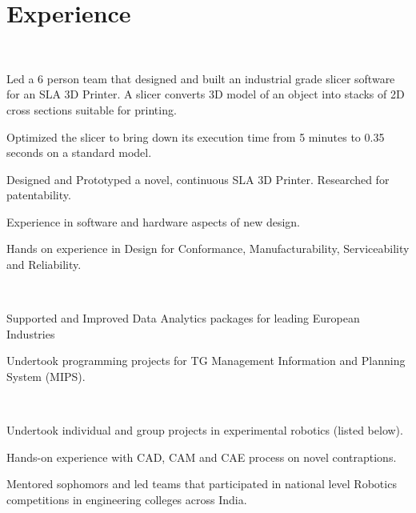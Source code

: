 \documentclass[]{deedy-resume-openfont}
\begin{document}
\begin{minipage}[t]{0.66\textwidth} 



\section{Experience}

\\
\vspace{\topsep}
\begin{tightemize}
\item  Led a 6 person team that designed and built an industrial grade slicer software for an SLA 3D Printer. A slicer converts 3D model of an object into stacks of 2D cross sections suitable for printing.
\item Optimized the slicer to bring down its execution time from 5 minutes to 0.35 seconds on a standard model.
\item Designed and Prototyped a novel, continuous SLA 3D Printer. Researched for patentability.
\item Experience in software and hardware aspects of new design. 
\item Hands on experience in Design for Conformance, Manufacturability, Serviceability and Reliability.
\end{tightemize}

\sectionsep{}

\\
\vspace{\topsep} %
\begin{tightemize}\item Supported and Improved Data Analytics packages for leading European Industries
\item Undertook programming projects for TG Management Information and Planning System (MIPS).
\end{tightemize}
\sectionsep



\\
\begin{tightemize}
\item Undertook individual and group projects in experimental robotics (listed below).
\item Hands-on experience with CAD, CAM and CAE process on novel contraptions.
\item Mentored sophomors and led teams that participated in national level Robotics competitions in engineering colleges across India.
\end{tightemize}
\sectionsep



\end{minipage}
\end{document}
